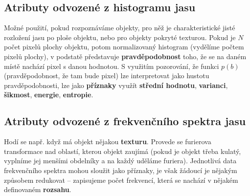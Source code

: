 \subsection{Atributy odvozené z histogramu jasu}
Možné použití, pokud rozpoznáváme objekty, pro něž je charakteristické jisté rozložení jasu po ploše objektu, nebo pro objekty pokryté texturou. Pokud je $N$ počet pixelů plochy objektu, potom normalizovaný histogram (vydělíme počtem pixelů plochy), v podstatě představuje \textbf{pravděpodobnost} toho, že se na daném místě nachází pixel s danou hodnotou. S využitím pozorování, že funkci $p(b)$ (pravděpodobnost, že tam bude pixel) lze interpretovat jako hustotu pravděpodobnosti, lze jako \textbf{příznaky} využít \textbf{střední hodnotu}, \textbf{varianci}, \textbf{šikmost}, \textbf{energie}, \textbf{entropie}.

\subsection{Atributy odvozené z frekvenčního spektra jasu}
Hodí se např. když má objekt nějakou \textbf{texturu}. Provede se furierova transformace nad oblastí, kterou objekt zaujímá (pokud je objekt třeba kulatý, vyplníme jej menšími obdelníky a na každý uděláme furiera). Jednotlivá data frekvenčního spektra mohou sloužit jako příznaky, je však žádoucí je nějakým způsobem redukovat -- zapisujeme počet frekvencí, která se nachází v nějakém definovaném \textbf{rozsahu}.

